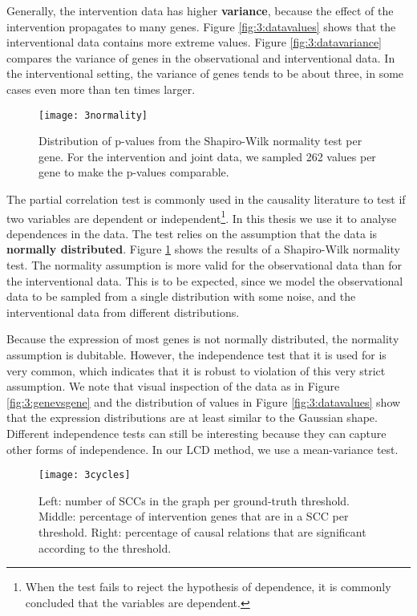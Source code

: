 Generally, the intervention data has higher \textbf{variance}, because the effect of the intervention propagates to many genes. Figure \ref{fig:3:datavalues} shows that the interventional data contains more extreme values. Figure \ref{fig:3:datavariance} compares the variance of genes in the observational and interventional data. In the interventional setting, the variance of genes tends to be about three, in some cases even more than ten times larger.

\begin{figure}[h]
    \centering
    \texttt{[image: 3normality]}
    \caption{Distribution of p-values from the Shapiro-Wilk normality test per gene. For the intervention and joint data, we sampled 262 values per gene to make the p-values comparable.}
    \label{fig:3:normality}
\end{figure}   

The partial correlation test is commonly used in the causality literature to test if two variables are dependent or independent\footnote{When the test fails to reject the hypothesis of dependence, it is commonly concluded that the variables are dependent.}. In this thesis we use it to analyse dependences in the data. The test relies on the assumption that the data is \textbf{normally distributed}. Figure \ref{fig:3:normality} shows the results of a Shapiro-Wilk normality test. The normality assumption is more valid for the observational data than for the interventional data. This is to be expected, since we model the observational data to be sampled from a single distribution with some noise, and the interventional data from different distributions. 

Because the expression of most genes is not normally distributed, the normality assumption is dubitable. However, the independence test that it is used for is very common, which indicates that it is robust to violation of this very strict assumption. We note that visual inspection of the data as in Figure \ref{fig:3:genevsgene} and the distribution of values in Figure \ref{fig:3:datavalues} show that the expression distributions are at least similar to the Gaussian shape. Different independence tests can still be interesting because they can capture other forms of independence. In our LCD method, we use a mean-variance test.

\begin{figure}[h]
    \centering
    \texttt{[image: 3cycles]}
    \caption{Left: number of SCCs in the graph per ground-truth threshold. Middle: percentage of intervention genes that are in a SCC per threshold. Right: percentage of causal relations that are significant according to the threshold.}
    \label{fig:3:cycles}
\end{figure}    

